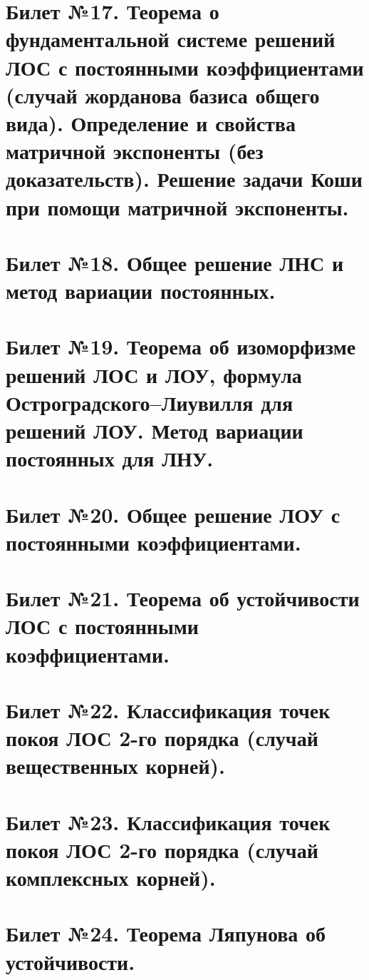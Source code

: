 \documentclass{article}
\begin{document}
\section{Билет №17. Теорема о фундаментальной системе решений ЛОС с постоянными коэффициентами (случай жорданова базиса общего вида). Определение и свойства матричной экспоненты (без доказательств). Решение задачи Коши при помощи матричной экспоненты.}


\section{Билет №18. Общее решение ЛНС и метод вариации постоянных.}


\section{Билет №19. Теорема об изоморфизме решений ЛОС и ЛОУ, формула Остроградского–Лиувилля для решений ЛОУ. Метод вариации постоянных для ЛНУ.}


\section{Билет №20. Общее решение ЛОУ с постоянными коэффициентами.}


\section{Билет №21. Теорема об устойчивости ЛОС с постоянными коэффициентами.}


\section{Билет №22. Классификация точек покоя ЛОС 2-го порядка (случай вещественных корней).}


\section{Билет №23. Классификация точек покоя ЛОС 2-го порядка (случай комплексных корней).}


\section{Билет №24. Теорема Ляпунова об устойчивости.}

\end{document}
